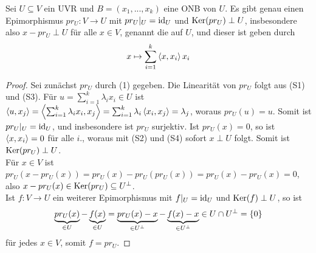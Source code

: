 \begin{proposition}
	Sei $U\subseteq V$ ein UVR und $B=(x_1,...,x_k)$ eine ONB von $U$. Es gibt genau einen Epimorphismus $pr_U:V\to U$ mit $pr_U\vert_U=\operatorname{id}_U$ und $\operatorname{Ker}(pr_U)\perp U$, insbesondere also $x-pr_U\perp U$ für alle $x\in V$, genannt die  auf $U$, und dieser ist geben durch
	\begin{align}
		x\mapsto\sum_{i=1}^k \left\langle x,x_i\right\rangle x_i
	\end{align}
\end{proposition}
\begin{proof}
	Sei zunächst $pr_U$ durch (1) gegeben. Die Linearität von $pr_U$ folgt aus (S1) und (S3). Für $u=\sum_{i=1}^k \lambda_i x_i\in U$ ist $\left\langle u,x_j\right\rangle=\left\langle \sum_{i=1}^k \lambda_i x_i,x_j\right\rangle=\sum_{i=1}^k \lambda_i\left\langle x_i,x_j\right\rangle=\lambda_j$, woraus $pr_U(u)=u$. Somit ist $pr_U\vert_U=\operatorname{id}_U$, und insbesondere ist $pr_U$ surjektiv. Ist $pr_U(x)=0$, so ist $\left\langle x,x_i\right\rangle=0$ für alle $i$., woraus mit (S2) und (S4) sofort $x\perp U$ folgt. Somit ist $\operatorname{Ker}(pr_U)\perp U$. \\
	Für $x\in V$ ist $pr_U(x-pr_U(x))=pr_U(x)-pr_U(pr_U(x))=pr_U(x)-pr_U(x)=0$, also $x-pr_U(x)\in\operatorname{Ker}(pr_U)\subseteq U^\perp$. \\
	Ist $f:V\to U$ ein weiterer Epimorphismus mit $f\vert_U=\operatorname{id}_U$ und $\operatorname{Ker}(f)\perp U$, so ist 
	\begin{align}
		\underbrace{pr_U(x)}_{\in U}-\underbrace{f(x)}_{\in U}=\underbrace{pr_U(x)-x}_{\in U^\perp}-\underbrace{f(x)-x}_{\in U^\perp}\in U\cap U^\perp =\{0\}\notag
	\end{align}
	für jedes $x\in V$, somit $f=pr_U$.
\end{proof}